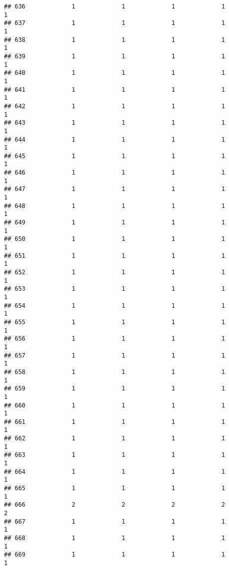 \documentclass[
]{article}
\begin{document}
\begin{verbatim}
## 636             1             1             1             1             1
## 637             1             1             1             1             1
## 638             1             1             1             1             1
## 639             1             1             1             1             1
## 640             1             1             1             1             1
## 641             1             1             1             1             1
## 642             1             1             1             1             1
## 643             1             1             1             1             1
## 644             1             1             1             1             1
## 645             1             1             1             1             1
## 646             1             1             1             1             1
## 647             1             1             1             1             1
## 648             1             1             1             1             1
## 649             1             1             1             1             1
## 650             1             1             1             1             1
## 651             1             1             1             1             1
## 652             1             1             1             1             1
## 653             1             1             1             1             1
## 654             1             1             1             1             1
## 655             1             1             1             1             1
## 656             1             1             1             1             1
## 657             1             1             1             1             1
## 658             1             1             1             1             1
## 659             1             1             1             1             1
## 660             1             1             1             1             1
## 661             1             1             1             1             1
## 662             1             1             1             1             1
## 663             1             1             1             1             1
## 664             1             1             1             1             1
## 665             1             1             1             1             1
## 666             2             2             2             2             2
## 667             1             1             1             1             1
## 668             1             1             1             1             1
## 669             1             1             1             1             1

\end{verbatim}
\end{document}
